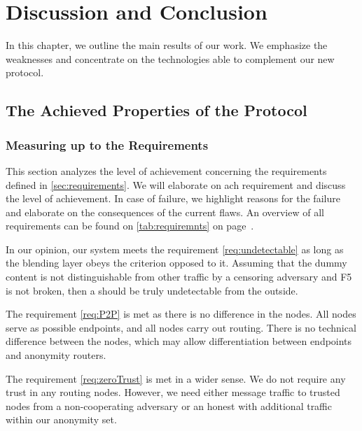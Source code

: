 \part{Discussion and Conclusion}

In this chapter, we outline the main results of our work. We emphasize the weaknesses and concentrate on the technologies able to complement our new protocol.

\chapter{The Achieved Properties of the Protocol}
\section{Measuring up to the Requirements\label{sec:reqDiscussion}}
This section analyzes the level of achievement concerning the requirements defined in \cref{sec:requirements}. We will elaborate on ach requirement and discuss the level of achievement. In case of failure, we highlight reasons for the failure and elaborate on the consequences of the current flaws. An overview of all requirements can be found on \cref{tab:requiremnts} on page~\pageref{tab:requiremnts}.

In our opinion, our system meets the requirement \ref{req:undetectable} as long as the blending layer obeys the criterion opposed to it. Assuming that the dummy content is not distinguishable from other traffic by a censoring adversary and F5 is not broken, then a \VortexNode{} should be truly undetectable from the outside.

The requirement \ref{req:P2P} is met as there is no difference in the nodes. All nodes serve as possible endpoints, and all nodes carry out routing. There is no technical difference between the nodes, which may allow differentiation between endpoints and anonymity routers.

The requirement \ref{req:zeroTrust} is met in a wider sense. We do not require any trust in any routing nodes. However, we need either message traffic to trusted nodes from a non-cooperating adversary or an honest \VortexNodes{} with additional traffic within our anonymity set. 

